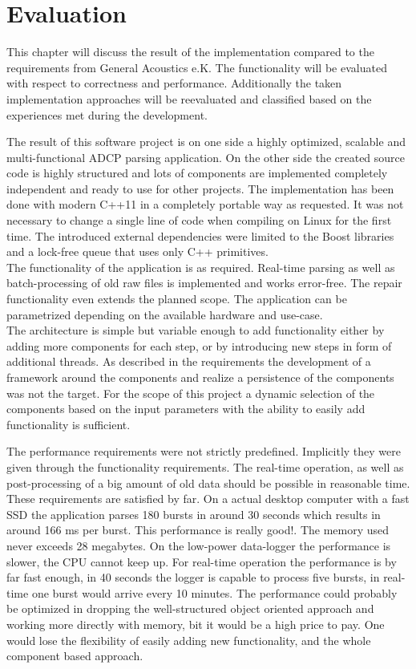 \chapter{Evaluation}
This chapter will discuss the result of the implementation compared to the requirements from General Acoustics e.K. The functionality will be evaluated with respect to correctness and performance. Additionally the taken implementation approaches will be reevaluated and classified based on the experiences met during the development.

The result of this software project is on one side a highly optimized, scalable and multi-functional ADCP parsing application. On the other side the created source code is highly structured and lots of components are implemented completely independent and ready to use for other projects. The implementation has been done with modern C++11 in a completely portable way as requested. It was not necessary to change a single line of code when compiling on Linux for the first time. The introduced external dependencies were limited to the Boost libraries and a lock-free queue that uses only C++ primitives.\\
The functionality of the application is as required. Real-time parsing as well as batch-processing of old raw files is implemented and works error-free. The repair functionality even extends the planned scope. The application can be parametrized depending on the available hardware and use-case.\\
The architecture is simple but variable enough to add functionality either by adding more components for each step, or by introducing new steps in form of additional threads. As described in the requirements the development of a framework around the components and realize a persistence of the components was not the target. For the scope of this project a dynamic selection of the components based on the input parameters with the ability to easily add functionality is sufficient.

The performance requirements were not  strictly predefined. Implicitly they were given through the functionality requirements. The real-time operation, as well as post-processing of a big amount of old data should be possible in reasonable time. These requirements are satisfied by far. On a actual desktop computer with a fast SSD the application parses 180 bursts in around 30 seconds which results in around 166 ms per burst. This performance is really good!. The memory used never exceeds 28 megabytes. On the low-power data-logger the performance is slower, the CPU cannot keep up. For real-time operation the performance is by far fast enough, in 40 seconds the logger is capable to process five bursts, in real-time one burst would arrive every 10 minutes. The performance could probably be optimized in dropping the well-structured object oriented approach and working more directly with memory, bit it would be a high price to pay. One would lose the flexibility of easily adding new functionality, and the whole component based approach.

